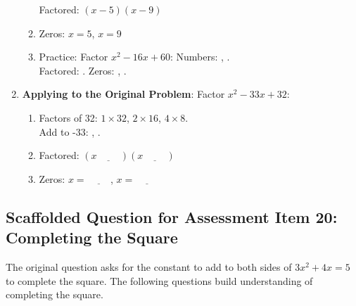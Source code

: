 \documentclass[12pt]{article}
\begin{document}
\begin{enumerate}[label=17.\arabic*]
\begin{enumerate}[label=\alph*)]
        Factored: \( (x - 5)(x - 9) \)
        \item Zeros: \( x = 5 \), \( x = 9 \)
        \item Practice: Factor \( x^2 - 16x + 60 \): Numbers: \underline{\hspace{0.5cm}}, \underline{\hspace{0.5cm}}. \\
        Factored: \underline{\hspace{2cm}}. Zeros: \underline{\hspace{0.5cm}}, \underline{\hspace{0.5cm}}.
    \end{enumerate}
    \item \textbf{Applying to the Original Problem}: Factor \( x^2 - 33x + 32 \):
    \begin{enumerate}[label=\alph*)]
        \item Factors of 32: \( 1 \times 32 \), \( 2 \times 16 \), \( 4 \times 8 \). \\
        Add to -33: \underline{\hspace{1cm}}, \underline{\hspace{1cm}}.
        \item Factored: \( (x \underline{\hspace{1cm}})(x \underline{\hspace{1cm}}) \)
        \item Zeros: \( x = \underline{\hspace{1cm}} \), \( x = \underline{\hspace{1cm}} \)
    \end{enumerate}
\end{enumerate}

\subsection*{Scaffolded Question for Assessment Item 20: Completing the Square}
The original question asks for the constant to add to both sides of \( 3x^2 + 4x = 5 \) to complete the square. The following questions build understanding of completing the square.
\end{document}
